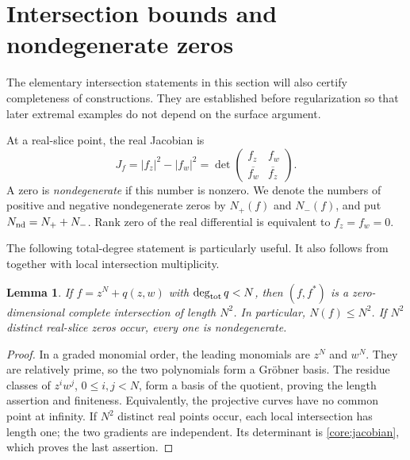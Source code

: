 \documentclass[UTF8,11pt]{ctexart}
\newtheorem{lem}[thm]{Lemma}
\theoremstyle{definition}
\numberwithin{equation}{section}
\begin{document}
\section{Intersection bounds and nondegenerate zeros}\label{core:algebra}
The elementary intersection statements in this section will also certify completeness of constructions. They are established before regularization so that later extremal examples do not depend on the surface argument.

At a real-slice point, the real Jacobian is
\begin{equation}\label{core:jacobian}
 J_f=|f_z|^2-|f_w|^2
 =\det\begin{pmatrix}f_z&f_w\\\overline{f_w}&\overline{f_z}\end{pmatrix}.
\end{equation}
A zero is \emph{nondegenerate} if this number is nonzero. We denote the numbers of positive and negative nondegenerate zeros by $N_+(f)$ and $N_-(f)$, and put $N_{\rm nd}=N_++N_-$. Rank zero of the real differential is equivalent to $f_z=f_w=0$.

The following total-degree statement is particularly useful. It also follows from \cite[Corollary~2.14, p.~7]{SZ24} together with local intersection multiplicity.
\begin{lem}\label{d:lem:pure}
If $f=z^N+q(z,w)$ with $\deg_{\rm tot}q<N$, then $(f,f^*)$ is a zero-dimensional complete intersection of length $N^2$. In particular, $N(f)\le N^2$. If $N^2$ distinct real-slice zeros occur, every one is nondegenerate.
\end{lem}
\begin{proof}
In a graded monomial order, the leading monomials are $z^N$ and $w^N$. They are relatively prime, so the two polynomials form a Gr\"obner basis. The residue classes of $z^iw^j$, $0\le i,j<N$, form a basis of the quotient, proving the length assertion and finiteness. Equivalently, the projective curves have no common point at infinity. If $N^2$ distinct real points occur, each local intersection has length one; the two gradients are independent. Its determinant is \eqref{core:jacobian}, which proves the last assertion.
\end{proof}
\end{document}
